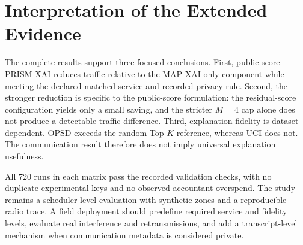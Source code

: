 \documentclass[10pt,conference]{IEEEtran}
\begin{document}


\FloatBarrier
\section{Interpretation of the Extended Evidence}

The complete results support three focused conclusions. First, public-score
PRISM-XAI reduces traffic relative to the MAP-XAI-only component while meeting
the declared matched-service and recorded-privacy rule. Second, the stronger
reduction is specific to the public-score formulation: the residual-score
configuration yields only a small saving, and the stricter $M=4$ cap alone
does not produce a detectable traffic difference. Third, explanation fidelity
is dataset dependent. OPSD exceeds the random Top-$K$ reference, whereas UCI
does not. The communication result therefore does not imply universal
explanation usefulness.

All 720 runs in each matrix pass the recorded validation checks, with no
duplicate experimental keys and no observed accountant overspend. The study
remains a scheduler-level evaluation with synthetic zones and a reproducible
radio trace. A field deployment should predefine required service and fidelity
levels, evaluate real interference and retransmissions, and add a
transcript-level mechanism when communication metadata is considered private.
\end{document}
